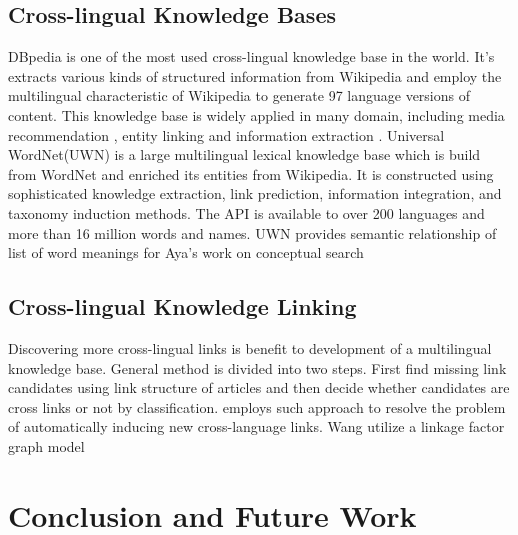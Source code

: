 \documentclass[runningheads,a4paper]{llncs}
\begin{document}
\subsection{Cross-lingual Knowledge Bases}
DBpedia \cite{auer2007dbpedia,mendes2012dbpedia} is one of the most used cross-lingual knowledge base in the world. It's extracts various kinds of structured information from Wikipedia and employ the multilingual characteristic of Wikipedia to generate 97 language versions of content. This knowledge base is widely applied in many domain, including media recommendation \cite{passant2010dbrec,fernandez2011generic,kaminskas2012knowledge}, entity linking\cite{mendes2011evaluating} and information extraction \cite{dutta2013integrating}.
Universal WordNet(UWN)\cite{de2012uwn} is a large multilingual lexical knowledge base which is build from WordNet and enriched its entities from Wikipedia. It is constructed using sophisticated knowledge extraction, link prediction, information integration, and taxonomy induction methods. The API is available to over 200 languages and more than 16 million words and names. UWN provides semantic relationship of list of word meanings for Aya's work on conceptual search \cite{al2015conceptual} 

\subsection{Cross-lingual Knowledge Linking}
Discovering more cross-lingual links is benefit to development of a multilingual knowledge base. General method is divided into two steps. First find missing link candidates using link structure of articles and then decide whether candidates are cross links or not by classification. \cite{sorg2008enriching} employs such approach to resolve the problem of automatically inducing new cross-language links. Wang\cite{wang2012cross} utilize a linkage factor graph model 

\section{Conclusion and Future Work}
\label{sec:con}




\end{document}
